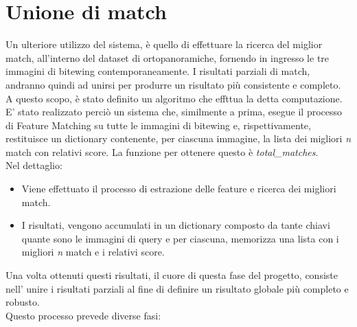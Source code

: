 \documentclass[12pt,a4paper,openright,twoside]{book}
\begin{document}
\chapter{Unione di match}
Un ulteriore utilizzo del sistema, è quello di effettuare la ricerca del miglior match, all'interno del dataset di ortopanoramiche, fornendo in ingresso le tre immagini di bitewing contemporaneamente. I risultati parziali di match, andranno quindi ad unirsi per produrre un risultato più consistente e completo.\\
A questo scopo, è stato definito un algoritmo che effttua la detta computazione.\\
E' stato realizzato perciò un sistema che, similmente a prima, esegue il processo di Feature Matching su tutte le immagini di bitewing e, rispettivamente, restituisce un dictionary contenente, per ciascuna immagine, la lista dei migliori {\itshape n} match con relativi score. La funzione per ottenere questo è {\itshape total\_matches}.\\
Nel dettaglio:
\begin{itemize}
\item Viene effettuato il processo di estrazione delle feature e ricerca dei migliori match.
\item I risultati, vengono accumulati in un dictionary composto da tante chiavi quante sono le immagini di query e per ciascuna, memorizza una lista con i migliori  {\itshape n} match e i relativi score.
\end{itemize}
Una volta ottenuti questi risultati, il cuore di questa fase del progetto, consiste nell' unire i risultati parziali al fine di definire un risultato globale più completo e robusto.\\
Questo processo prevede diverse fasi:
\end{document}
